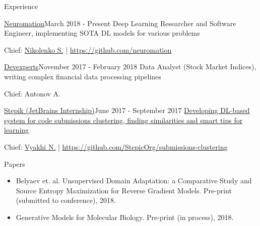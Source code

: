 \documentclass{resume} %
\newcommand{\SKIPSM}{\vspace{-0.7\baselineskip}}
\begin{document}
\SKIPSM
\begin{rSection}{Experience}

\begin{rSubsection}{\href{https://neuromation.io}{Neuromation}}{March 2018 - Present}
{Deep Learning Researcher and Software Engineer, implementing SOTA DL models for various problems}{} 
\item[] Chief: \href{https://logic.pdmi.ras.ru/~sergey/}{Nikolenko S.} | \url{https://github.com/neuromation}
\end{rSubsection}

\vspace{-0.9\baselineskip}
\begin{rSubsection}{\href{https://devexperts.com/en/index.html}{Devexperts}}{November 2017 - February 2018}
{Data Analyst (Stock Market Indices), writing complex financial data processing pipelines}{} 
\item[] Chief: Antonov A.
\end{rSubsection}

\vspace{-0.9\baselineskip}
\begin{rSubsection}{\href{http://stepik.org/}{Stepik (JetBrains Internship)}}{June 2017 - September 2017}
{\href{https://jetbrains.ru/students/internship/themes/again/}{Developing DL-based system for code submissions clustering, finding similarities and smart tips for learning}}{} 
\item[] Chief: \href{http://bioinformaticsinstitute.ru/teachers/vyahhi}{Vyakhi N.} | \url{https://github.com/StepicOrg/submissions-clustering}
\end{rSubsection}

\end{rSection}
\vspace{-1.1\baselineskip}
\begin{rSection}{Papers}

\begin{itemize}
    \item Belyaev et. al. Unsupervised Domain Adaptation: a Comparative Study and Source Entropy Maximization for Reverse Gradient Models. Pre-print (submitted to conference), 2018.
    \vspace{-0.5\baselineskip}
    \item Generative Models for Molecular Biology. Pre-print (in process), 2018.
\end{itemize}

\end{rSection}
\end{document}
